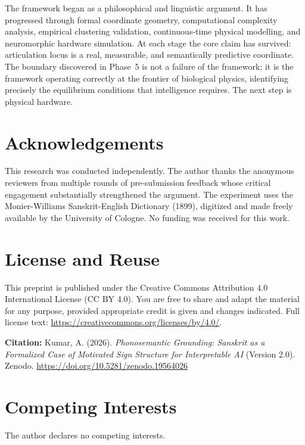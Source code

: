\documentclass[12pt]{article}
\begin{document}
The framework began as a philosophical and linguistic argument. It has progressed through formal coordinate geometry, computational complexity analysis, empirical clustering validation, continuous-time physical modelling, and neuromorphic hardware simulation. At each stage the core claim has survived: articulation locus is a real, measurable, and semantically predictive coordinate. The boundary discovered in Phase~5 is not a failure of the framework; it is the framework operating correctly at the frontier of biological physics, identifying precisely the equilibrium conditions that intelligence requires. The next step is physical hardware.


\section*{Acknowledgements}

This research was conducted independently. The author thanks the anonymous reviewers from multiple rounds of pre-submission feedback whose critical engagement substantially strengthened the argument. The experiment uses the Monier-Williams Sanskrit-English Dictionary (1899), digitized and made freely available by the University of Cologne. No funding was received for this work.

\section*{License and Reuse}

This preprint is published under the Creative Commons Attribution 4.0 International License (CC BY 4.0). You are free to share and adapt the material for any purpose, provided appropriate credit is given and changes indicated. Full license text: \url{https://creativecommons.org/licenses/by/4.0/}.

\medskip
\noindent\textbf{Citation:} Kumar, A. (2026). \textit{Phonosemantic Grounding: Sanskrit as a Formalized Case of Motivated Sign Structure for Interpretable AI} (Version 2.0). Zenodo. \href{https://doi.org/10.5281/zenodo.19564026}{https://doi.org/10.5281/zenodo.19564026}

\section*{Competing Interests}

The author declares no competing interests.



\end{document}
